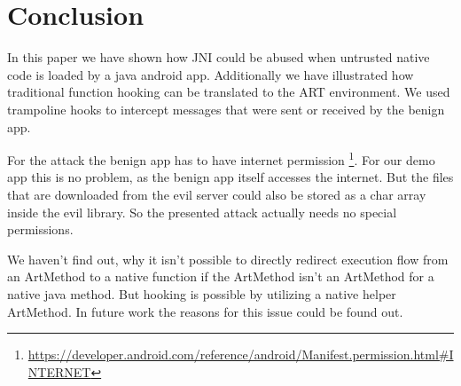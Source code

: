 
\section{Conclusion}

In this paper we have shown how JNI could be abused when untrusted native code is loaded by a java android app. Additionally we have illustrated how traditional function hooking can be translated to the ART environment. We used trampoline hooks to intercept messages that were sent or received by the benign app.

For the attack the benign app has to have internet permission \footnote{\url{https://developer.android.com/reference/android/Manifest.permission.html\#INTERNET}}. For our demo app this is no problem, as the benign app itself accesses the internet. But the files that are downloaded from the evil server could also be stored as a char array inside the evil library. So the presented attack actually needs no special permissions.

We haven't find out, why it isn't possible to directly redirect execution flow from an ArtMethod to a native function if the ArtMethod isn't an ArtMethod for a native java method. But hooking is  possible by utilizing a native helper ArtMethod. In future work the reasons for this issue could be found out. 